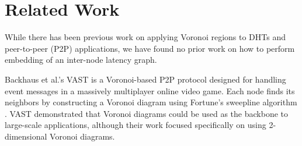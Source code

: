 

\section{Related Work}
\label{sec:related}
While there has been previous work on applying Voronoi regions to DHTs and peer-to-peer (P2P) applications, we have found no prior work on how to perform embedding of an inter-node latency graph.   

Backhaus et al.'s  VAST \cite{Backhaus:2007:VAS:1326257.1326266} is a Voronoi-based P2P protocol designed for handling event messages in a massively multiplayer online video game.  
Each node finds its neighbors by constructing a Voronoi diagram using Fortune's sweepline algorithm \cite{fortune1987sweepline}.  
VAST demonstrated that Voronoi diagrams could be used as the backbone to large-scale applications, although their work focused specifically on using 2-dimensional Voronoi diagrams.

